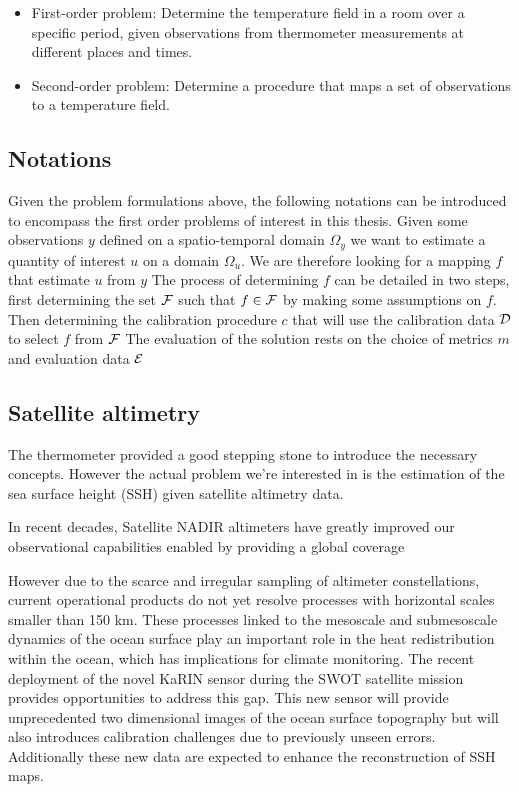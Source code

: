 \begin{bibunit}
\begin{itemize}
    \item First-order problem: Determine the temperature field in a room over a specific period, given observations from thermometer measurements at different places and times.
    \item Second-order problem: Determine a procedure that maps a set of observations to a temperature field.
\end{itemize}

\subsection{Notations}
Given the problem formulations above, the following notations can be introduced to encompass the first order problems of interest in this thesis.
Given some observations $y$ defined on a spatio-temporal domain $\Omega_y$ we want to estimate a quantity of interest $u$ on a domain $\Omega_u$. We are therefore looking for a mapping $f$ that estimate $u$ from $y$
The process of determining $f$ can be detailed in two steps, first determining the set $\cal{F}$ such that $f \in \cal{F}$ by making some assumptions on $f$. Then determining the calibration procedure $c$ that will use the calibration data $\cal{D}$ to select $f$ from $\cal{F}$
The evaluation of the solution rests on the choice of metrics $m$ and evaluation data $\cal{E}$

\subsection{Satellite altimetry}
The thermometer provided a good stepping stone to introduce the necessary concepts.
However the actual problem we're interested in is the estimation of the sea surface height (SSH) given satellite altimetry data.

In recent decades, Satellite NADIR altimeters have greatly improved our observational capabilities enabled by providing a global coverage 

However due to the scarce and irregular sampling of altimeter constellations, current operational products do not yet resolve processes with horizontal scales smaller than 150 km\cite{}.
These processes linked to the mesoscale and submesoscale dynamics of the ocean surface play an important role in the heat redistribution within the ocean, which has implications for climate monitoring.
The recent deployment of the novel KaRIN sensor during the SWOT satellite mission\cite{} provides opportunities to address this gap.
This new sensor will provide unprecedented two dimensional images of the ocean surface topography but will also introduces calibration challenges\cite{} due to previously unseen errors.
Additionally these new data are expected to enhance the reconstruction of SSH maps.


\end{bibunit}

